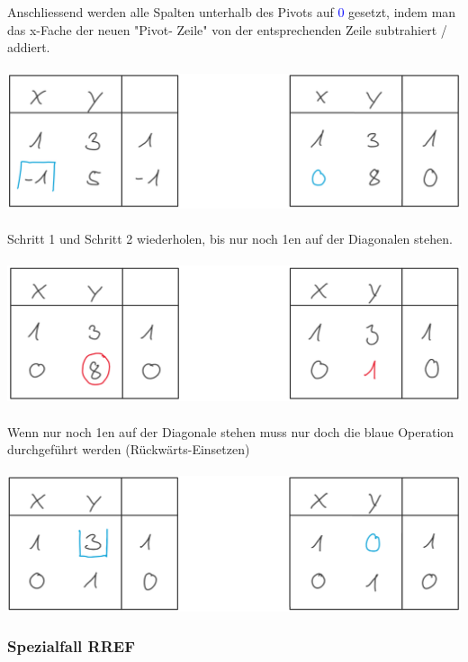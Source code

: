 		    Anschliessend werden alle Spalten unterhalb des Pivots auf \textcolor{blue}0 gesetzt, indem man das x-Fache der neuen "Pivot- Zeile" von der entsprechenden Zeile subtrahiert / addiert. \\
		    \\
		    \includegraphics[width=0.45\linewidth]{Bilder/gauss2} \\
		    \\
		    Schritt 1 und Schritt 2 wiederholen, bis nur noch 1en auf der Diagonalen stehen. \\
		    \\
		    \includegraphics[width=0.45\linewidth]{Bilder/gauss3} \\
		    \\
		    Wenn nur noch 1en auf der Diagonale stehen muss nur doch die blaue Operation durchgeführt werden (Rückwärts-Einsetzen) \\
		    \\
		    \includegraphics[width=0.45\linewidth]{Bilder/gauss4} \\
		    
		    
		    
			\subsubsection{Spezialfall RREF}
	
